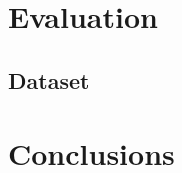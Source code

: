 \documentclass[draft,final]{vutinfth} %
\begin{document}

\chapter{Evaluation}

\section{Dataset}



\chapter{Conclusions}

\backmatter

\listoffigures %

\cleardoublepage %
\listoftables %

\listofalgorithms
{}

\printindex

\printglossaries



\end{document}
